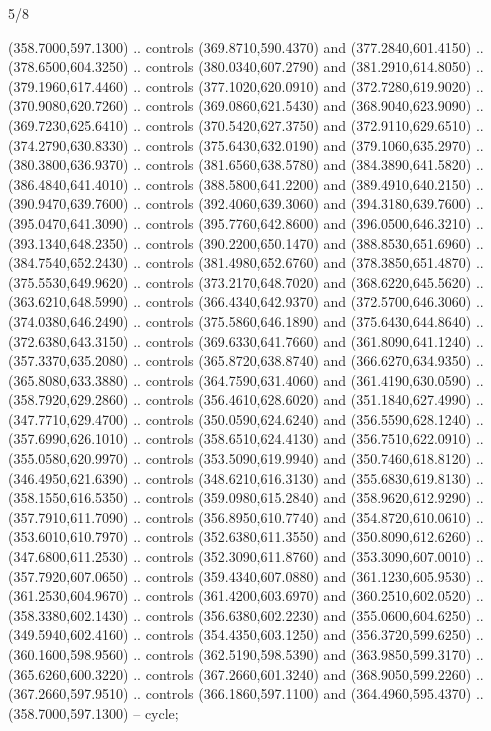 \begin{flagdescription}{5/8}
\begin{scope}[shift={(m)}]
\begin{scope}[scale=\flagwidth/220,y=0.1mm, x=0.1mm, yscale=-1,shift={(-596,-360)}]
\begin{scope}[cm={{-1.0,0.0,0.0,1.0,(1193.9797,0.0)}}]
\begin{scope}[draw=black,line join=round,line cap=round,line width=0.381\lw]
\begin{scope}[line width=0.534\lw,fill=green]
 (358.7000,597.1300) .. controls (369.8710,590.4370) and
  (377.2840,601.4150) .. (378.6500,604.3250) .. controls (380.0340,607.2790) and
  (381.2910,614.8050) .. (379.1960,617.4460) .. controls (377.1020,620.0910) and
  (372.7280,619.9020) .. (370.9080,620.7260) .. controls (369.0860,621.5430) and
  (368.9040,623.9090) .. (369.7230,625.6410) .. controls (370.5420,627.3750) and
  (372.9110,629.6510) .. (374.2790,630.8330) .. controls (375.6430,632.0190) and
  (379.1060,635.2970) .. (380.3800,636.9370) .. controls (381.6560,638.5780) and
  (384.3890,641.5820) .. (386.4840,641.4010) .. controls (388.5800,641.2200) and
  (389.4910,640.2150) .. (390.9470,639.7600) .. controls (392.4060,639.3060) and
  (394.3180,639.7600) .. (395.0470,641.3090) .. controls (395.7760,642.8600) and
  (396.0500,646.3210) .. (393.1340,648.2350) .. controls (390.2200,650.1470) and
  (388.8530,651.6960) .. (384.7540,652.2430) .. controls (381.4980,652.6760) and
  (378.3850,651.4870) .. (375.5530,649.9620) .. controls (373.2170,648.7020) and
  (368.6220,645.5620) .. (363.6210,648.5990) .. controls (366.4340,642.9370) and
  (372.5700,646.3060) .. (374.0380,646.2490) .. controls (375.5860,646.1890) and
  (375.6430,644.8640) .. (372.6380,643.3150) .. controls (369.6330,641.7660) and
  (361.8090,641.1240) .. (357.3370,635.2080) .. controls (365.8720,638.8740) and
  (366.6270,634.9350) .. (365.8080,633.3880) .. controls (364.7590,631.4060) and
  (361.4190,630.0590) .. (358.7920,629.2860) .. controls (356.4610,628.6020) and
  (351.1840,627.4990) .. (347.7710,629.4700) .. controls (350.0590,624.6240) and
  (356.5590,628.1240) .. (357.6990,626.1010) .. controls (358.6510,624.4130) and
  (356.7510,622.0910) .. (355.0580,620.9970) .. controls (353.5090,619.9940) and
  (350.7460,618.8120) .. (346.4950,621.6390) .. controls (348.6210,616.3130) and
  (355.6830,619.8130) .. (358.1550,616.5350) .. controls (359.0980,615.2840) and
  (358.9620,612.9290) .. (357.7910,611.7090) .. controls (356.8950,610.7740) and
  (354.8720,610.0610) .. (353.6010,610.7970) .. controls (352.6380,611.3550) and
  (350.8090,612.6260) .. (347.6800,611.2530) .. controls (352.3090,611.8760) and
  (353.3090,607.0010) .. (357.7920,607.0650) .. controls (359.4340,607.0880) and
  (361.1230,605.9530) .. (361.2530,604.9670) .. controls (361.4200,603.6970) and
  (360.2510,602.0520) .. (358.3380,602.1430) .. controls (356.6380,602.2230) and
  (355.0600,604.6250) .. (349.5940,602.4160) .. controls (354.4350,603.1250) and
  (356.3720,599.6250) .. (360.1600,598.9560) .. controls (362.5190,598.5390) and
  (363.9850,599.3170) .. (365.6260,600.3220) .. controls (367.2660,601.3240) and
  (368.9050,599.2260) .. (367.2660,597.9510) .. controls (366.1860,597.1100) and
  (364.4960,595.4370) .. (358.7000,597.1300) -- cycle;


\end{scope}
\end{scope}
\end{scope}
\end{scope}
\end{scope}
\end{flagdescription}
